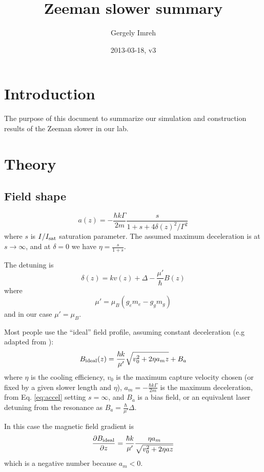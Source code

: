 \documentclass[12pt,a4paper]{article}
\author{Gergely Imreh}
\title{Zeeman slower summary}
\date{2013-03-18, v3}
\begin{document}
\maketitle

\section{Introduction}

The purpose of this document to summarize our simulation and construction results of the Zeeman slower in our lab.

\section{Theory}

\subsection{Field shape}

\begin{equation}
a(z) = -\frac{\hbar k \Gamma}{2 m} \frac{s}{1 + s + 4 \delta(z)^2 / \Gamma^2}
\label{eq:accel}
\end{equation}
where $s$ is $I/I_{\rm sat}$ saturation parameter. The assumed maximum deceleration is at $s \rightarrow \infty$, and at $\delta = 0$ we have $\eta = \frac{s}{1 + s}$.

The detuning is
\begin{equation}
\delta(z) = k v(z) + \Delta - \frac{\mu'}{\hbar} B(z)
\end{equation}
where
\begin{equation}
\mu' = \mu_{B}(g_e m_e - g_g m_g)
\end{equation}
and in our case $\mu' = \mu_{B}$.

Most people use the ``ideal'' field profile, assuming constant deceleration (e.g adapted from \citet{Bell2010}):
\begin{equation}
B_{\rm ideal}(z) = \frac{\hbar k}{\mu'}\sqrt{v_0^2 + 2 \eta a_m z} + B_a
\label{eq:bideal}
\end{equation}
where $\eta$ is the cooling efficiency, $v_0$ is the maximum capture velocity chosen (or fixed by a given slower length and $\eta$), $a_m = -\frac{\hbar k \Gamma}{2 m}$ is the maximum deceleration, from Eq. \ref{eq:accel} setting $s = \infty$, and $B_a$ is a bias field, or an equivalent laser detuning from the resonance as $B_a = \frac{\hbar}{\mu'} \Delta$.

In this case the magnetic field gradient is
\begin{equation}
\frac{\partial B_{\rm ideal}}{\partial z} = \frac{\hbar k}{\mu'} \frac{\eta a_m}{\sqrt{v_0^2 + 2 \eta a z}}
\end{equation}
which is a negative number because $a_m < 0$.
\end{document}

